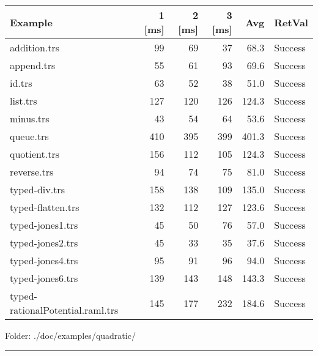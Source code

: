 \documentclass[11pt]{article}
\begin{document}
\begin{center}
\begin{tabular}{lrrrrl}
\hline
Example & 1 [ms] & 2 [ms] & 3 [ms] & Avg & RetVal\\
\hline
addition.trs & 99 & 69 & 37 & 68.3 & Success\\
append.trs & 55 & 61 & 93 & 69.6 & Success\\
id.trs & 63 & 52 & 38 & 51.0 & Success\\
list.trs & 127 & 120 & 126 & 124.3 & Success\\
minus.trs & 43 & 54 & 64 & 53.6 & Success\\
queue.trs & 410 & 395 & 399 & 401.3 & Success\\
quotient.trs & 156 & 112 & 105 & 124.3 & Success\\
reverse.trs & 94 & 74 & 75 & 81.0 & Success\\
typed-div.trs & 158 & 138 & 109 & 135.0 & Success\\
typed-flatten.trs & 132 & 112 & 127 & 123.6 & Success\\
typed-jones1.trs & 45 & 50 & 76 & 57.0 & Success\\
typed-jones2.trs & 45 & 33 & 35 & 37.6 & Success\\
typed-jones4.trs & 95 & 91 & 96 & 94.0 & Success\\
typed-jones6.trs & 139 & 143 & 148 & 143.3 & Success\\
typed-rationalPotential.raml.trs & 145 & 177 & 232 & 184.6 & Success\\
\hline
\end{tabular}

\end{center}

Folder: ./doc/examples/quadratic/

\rule{\linewidth}{0.5pt}
\end{document}
